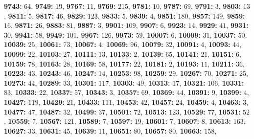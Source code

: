 \textsf{\bfseries 9743:} $64$, \textsf{\bfseries 9749:} $19$, \textsf{\bfseries 9767:} $11$, \textsf{\bfseries 9769:} $215$, \textsf{\bfseries 9781:} $10$, \textsf{\bfseries 9787:} $69$, \textsf{\bfseries 9791:} $3$, \textsf{\bfseries 9803:} $13$, \textsf{\bfseries 9811:} $5$, \textsf{\bfseries 9817:} $46$, \textsf{\bfseries 9829:} $123$, \textsf{\bfseries 9833:} $5$, \textsf{\bfseries 9839:} $4$, \textsf{\bfseries 9851:} $180$, \textsf{\bfseries 9857:} $149$, \textsf{\bfseries 9859:} $16$, \textsf{\bfseries 9871:} $26$, \textsf{\bfseries 9883:} $81$, \textsf{\bfseries 9887:} $3$, \textsf{\bfseries 9901:} $109$, \textsf{\bfseries 9907:} $6$, \textsf{\bfseries 9923:} $14$, \textsf{\bfseries 9929:} $41$, \textsf{\bfseries 9931:} $30$, \textsf{\bfseries 9941:} $58$, \textsf{\bfseries 9949:} $101$, \textsf{\bfseries 9967:} $126$, \textsf{\bfseries 9973:} $59$, \textsf{\bfseries 10007:} $6$, \textsf{\bfseries 10009:} $31$, \textsf{\bfseries 10037:} $50$, \textsf{\bfseries 10039:} $25$, \textsf{\bfseries 10061:} $73$, \textsf{\bfseries 10067:} $4$, \textsf{\bfseries 10069:} $96$, \textsf{\bfseries 10079:} $32$, \textsf{\bfseries 10091:} $4$, \textsf{\bfseries 10093:} $44$, \textsf{\bfseries 10099:} $22$, \textsf{\bfseries 10103:} $27$, \textsf{\bfseries 10111:} $13$, \textsf{\bfseries 10133:} $2$, \textsf{\bfseries 10139:} $65$, \textsf{\bfseries 10141:} $21$, \textsf{\bfseries 10151:} $6$, \textsf{\bfseries 10159:} $78$, \textsf{\bfseries 10163:} $28$, \textsf{\bfseries 10169:} $58$, \textsf{\bfseries 10177:} $22$, \textsf{\bfseries 10181:} $2$, \textsf{\bfseries 10193:} $11$, \textsf{\bfseries 10211:} $36$, \textsf{\bfseries 10223:} $43$, \textsf{\bfseries 10243:} $46$, \textsf{\bfseries 10247:} $14$, \textsf{\bfseries 10253:} $98$, \textsf{\bfseries 10259:} $29$, \textsf{\bfseries 10267:} $70$, \textsf{\bfseries 10271:} $25$, \textsf{\bfseries 10273:} $44$, \textsf{\bfseries 10289:} $33$, \textsf{\bfseries 10301:} $117$, \textsf{\bfseries 10303:} $49$, \textsf{\bfseries 10313:} $17$, \textsf{\bfseries 10321:} $106$, \textsf{\bfseries 10331:} $83$, \textsf{\bfseries 10333:} $22$, \textsf{\bfseries 10337:} $57$, \textsf{\bfseries 10343:} $3$, \textsf{\bfseries 10357:} $69$, \textsf{\bfseries 10369:} $44$, \textsf{\bfseries 10391:} $9$, \textsf{\bfseries 10399:} $4$, \textsf{\bfseries 10427:} $119$, \textsf{\bfseries 10429:} $21$, \textsf{\bfseries 10433:} $111$, \textsf{\bfseries 10453:} $42$, \textsf{\bfseries 10457:} $24$, \textsf{\bfseries 10459:} $4$, \textsf{\bfseries 10463:} $3$, \textsf{\bfseries 10477:} $47$, \textsf{\bfseries 10487:} $32$, \textsf{\bfseries 10499:} $37$, \textsf{\bfseries 10501:} $72$, \textsf{\bfseries 10513:} $123$, \textsf{\bfseries 10529:} $77$, \textsf{\bfseries 10531:} $52$, \textsf{\bfseries 10559:} $7$, \textsf{\bfseries 10567:} $121$, \textsf{\bfseries 10589:} $7$, \textsf{\bfseries 10597:} $19$, \textsf{\bfseries 10601:} $7$, \textsf{\bfseries 10607:} $8$, \textsf{\bfseries 10613:} $163$, \textsf{\bfseries 10627:} $33$, \textsf{\bfseries 10631:} $45$, \textsf{\bfseries 10639:} $11$, \textsf{\bfseries 10651:} $80$, \textsf{\bfseries 10657:} $80$, \textsf{\bfseries 10663:} $158$, 
